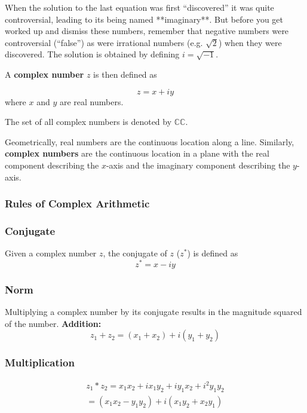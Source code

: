 When the solution to the last equation was first ``discovered'' it was quite controversial, leading to its being named **imaginary**. But before you get worked up and dismiss these numbers, remember that negative numbers were controversial (``false'') as were irrational numbers (e.g. $\sqrt{2}$) when they were discovered. The solution is obtained by defining $i=\sqrt{-1}$.

A \textbf{complex number} $z$ is then defined as

\begin{equation}
z = x+iy
\end{equation}
where $x$ and $y$ are real numbers.

The set of all complex numbers is denoted by $\mathbb{CC}$.

Geometrically, real numbers are the continuous location along a line. Similarly, \textbf{complex numbers} are the continuous location in a plane with the real component describing the $x$-axis and the imaginary component describing the $y$-axis.


\subsubsection{Rules of Complex Arithmetic}

\subsubsection{Conjugate}

Given a complex number $z$, the conjugate of $z$ ($z^*$) is defined as
\begin{equation}
z^*=x-iy
\end{equation}

\subsubsection{Norm}

Multiplying a complex number by its conjugate results in the magnitude squared of the number.
{\bf Addition:}
\begin{equation}
z_1+z_2 = (x_1+x_2)+i(y_1+y_2)
\end{equation}

\subsubsection{Multiplication}
\begin{eqnarray}
z_1*z_2 = x_1x_2+ix_1y_2+iy_1x_2+i^2y_1y_2\\ \nonumber
= (x_1x_2-y_1y_2)+i(x_1y_2+x_2y_1)
\end{eqnarray}

